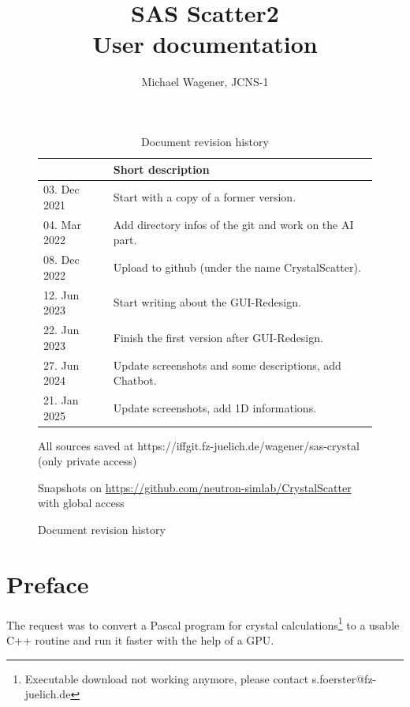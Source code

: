 \documentclass[11pt]{article} %
\author{Michael Wagener, JCNS-1}
\title{SAS Scatter2 \\[1ex] {\large User documentation}}
\begin{document}
\maketitle
\tableofcontents %

\clearpage
\begin{figure}  %
\begin{longtable}{|p{3cm}|p{12cm}|}
\caption{Document revision history} \\
\hline
\rowcolor{rowcolor}{\bf Date} & {\bf Short description} \\
\endfirsthead
\hline
03. Dec 2021 & Start with a copy of a former version. \\ \hline
04. Mar 2022 & Add directory infos of the git and work on the AI part. \\ \hline
08. Dec 2022 & Upload to github (under the name CrystalScatter). \\ \hline
12. Jun 2023 & Start writing about the GUI-Redesign. \\ \hline
22. Jun 2023 & Finish the first version after GUI-Redesign. \\ \hline
27. Jun 2024 & Update screenshots and some descriptions, add Chatbot. \\ \hline
21. Jan 2025 & Update screenshots, add 1D informations. \\ \hline
\end{longtable}

\centerline{All sources saved at https://iffgit.fz-juelich.de/wagener/sas-crystal (only private access)}
\centerline{Snapshots on \url{https://github.com/neutron-simlab/CrystalScatter} with global access}
\end{figure}

\clearpage %


\section{Preface}

The request was to convert a Pascal program for crystal calculations\footnote{Executable download not working anymore, please contact s.foerster@fz-juelich.de}
to a usable C++ routine and run it faster with the help of a GPU.
\end{document}
